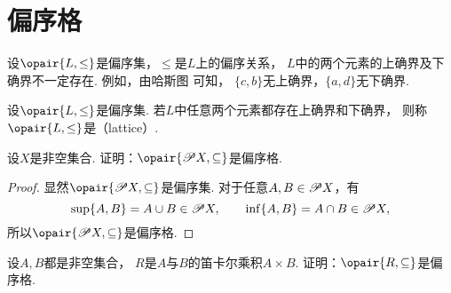 \section{偏序格}
设\(\opair{L,\leq}\)是偏序集，\(\leq\)是\(L\)上的偏序关系，
\(L\)中的两个元素的上确界及下确界不一定存在.
例如，由哈斯图  可知，
\(\{c,b\}\)无上确界，\(\{a,d\}\)无下确界.

\begin{figure}[htb]
	\centering
	\caption{}
	\label{figure:格论.偏序集1}
\end{figure}

\begin{definition}
设\(\opair{L,\leq}\)是偏序集.
若\(L\)中任意两个元素都存在上确界和下确界，
则称\(\opair{L,\leq}\)是（lattice）.
\end{definition}

\begin{example}
设\(X\)是非空集合.
证明：\(\opair{\Powerset X,\subseteq}\)是偏序格.
\begin{proof}
显然\(\opair{\Powerset X,\subseteq}\)是偏序集.
对于任意\(A,B \in \mathscr{P} X\)，有\begin{equation*}
	\sup\{A,B\}
	= A \cup B
	\in \mathscr{P} X,
	\qquad
	\inf\{A,B\}
	= A \cap B
	\in \mathscr{P} X,
\end{equation*}
所以\(\opair{\Powerset X,\subseteq}\)是偏序格.
\end{proof}
\end{example}

\begin{example}
设\(A,B\)都是非空集合，
\(R\)是\(A\)与\(B\)的笛卡尔乘积\(A \times B\).
证明：\(\opair{R,\subseteq}\)是偏序格.
\end{example}

